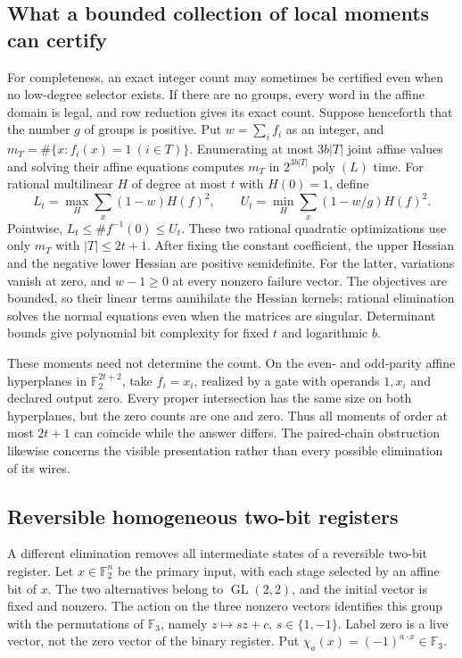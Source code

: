 \subsection{What a bounded collection of local moments can certify}
For completeness, an exact integer count may sometimes be certified even when no low-degree selector exists. If there are no groups, every word in the affine domain is legal, and row reduction gives its exact count. Suppose henceforth that the number $g$ of groups is positive. Put $w=\sum_i f_i$ as an integer, and $m_T=\#\{x:f_i(x)=1\ (i\in T)\}$. Enumerating at most $3b|T|$ joint affine values and solving their affine equations computes $m_T$ in $2^{3b|T|}\operatorname{poly}(L)$ time. For rational multilinear $H$ of degree at most $t$ with $H(0)=1$, define
\[
 L_t=\max_H\sum_x(1-w)H(f)^2,
 \qquad U_t=\min_H\sum_x(1-w/g)H(f)^2.
\]
Pointwise, $L_t\le\#f^{-1}(0)\le U_t$. These two rational quadratic optimizations use only $m_T$ with $|T|\le2t+1$. After fixing the constant coefficient, the upper Hessian and the negative lower Hessian are positive semidefinite. For the latter, variations vanish at zero, and $w-1\ge0$ at every nonzero failure vector. The objectives are bounded, so their linear terms annihilate the Hessian kernels; rational elimination solves the normal equations even when the matrices are singular. Determinant bounds give polynomial bit complexity for fixed $t$ and logarithmic $b$.

These moments need not determine the count. On the even- and odd-parity affine hyperplanes in $\mathbb F_2^{2t+2}$, take $f_i=x_i$, realized by a gate with operands $1,x_i$ and declared output zero. Every proper intersection has the same size on both hyperplanes, but the zero counts are one and zero. Thus all moments of order at most $2t+1$ can coincide while the answer differs. The paired-chain obstruction likewise concerns the visible presentation rather than every possible elimination of its wires.

\subsection{Reversible homogeneous two-bit registers}
A different elimination removes all intermediate states of a reversible two-bit register. Let $x\in\mathbb F_2^n$ be the primary input, with each stage selected by an affine bit of $x$. The two alternatives belong to $\operatorname{GL}(2,2)$, and the initial vector is fixed and nonzero. The action on the three nonzero vectors identifies this group with the permutations of $\mathbb F_3$, namely $z\mapsto sz+c$, $s\in\{1,-1\}$. Label zero is a live vector, not the zero vector of the binary register. Put $\chi_a(x)=(-1)^{a\cdot x}\in\mathbb F_3$.

